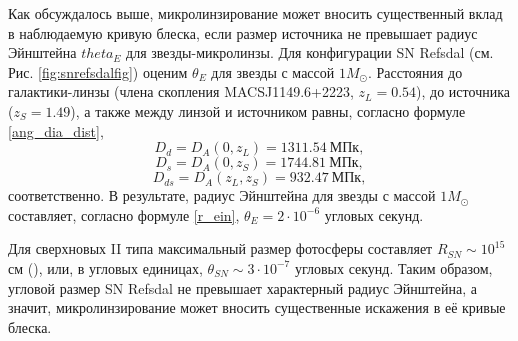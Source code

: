 Как обсуждалось выше, микролинзирование может вносить существенный вклад в наблюдаемую кривую блеска, если размер источника не превышает радиус Эйнштейна $theta_E$ для звезды-микролинзы. Для конфигурации SN Refsdal (см. Рис. \ref{fig:snrefsdalfig}) оценим $\theta_E$ для звезды с массой $1 M_{\odot}$. Расстояния до галактики-линзы (члена скопления MACSJ1149.6+2223, $z_L=0.54$), до источника ($z_S=1.49$), а также между линзой и источником равны, согласно формуле \eqref{ang_dia_dist}, 
$$ D_d=D_A(0,z_L)=1311.54 \ \textrm{МПк}, $$
$$ D_s=D_A(0,z_S)=1744.81 \ \textrm{МПк}, $$
$$ D_{ds}=D_A(z_L,z_S)=932.47 \ \textrm{МПк}, $$
соответственно. В результате, радиус Эйнштейна для звезды с массой $1 M_{\odot}$ составляет, согласно формуле \eqref{r_ein}, $\theta_E = 2 \cdot 10^{-6}$ угловых секунд.

Для сверхновых II типа максимальный размер фотосферы составляет $R_{SN} \sim 10^{15}$ см (\cite{razmer}), или, в угловых единицах, $\theta_{SN} \sim 3 \cdot 10^{-7}$ угловых секунд. Таким образом, угловой размер SN Refsdal не превышает характерный радиус Эйнштейна, 
а значит, микролинзирование может вносить существенные искажения в её кривые блеска.